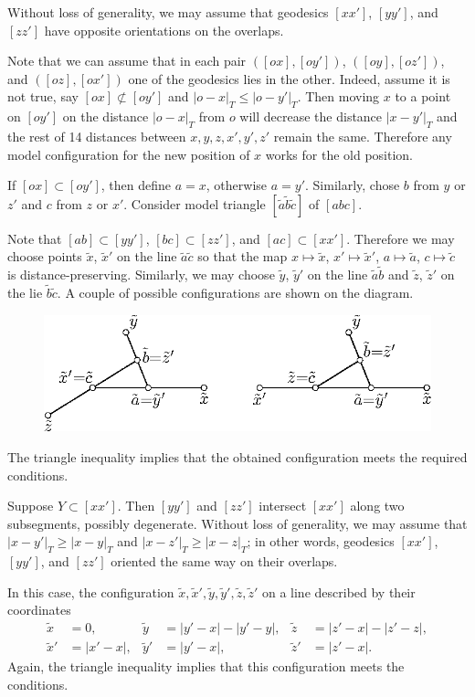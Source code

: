 \documentclass{article}
\begin{document}
Without loss of generality, we may assume that geodesics $[xx']$, $[yy']$, and $[zz']$ have opposite orientations on the overlaps.

Note that we can assume that in each pair $([ox],[oy'])$, $([oy],[oz'])$, and $([oz],[ox'])$ one of the geodesics lies in the other.
Indeed, assume it is not true, say $[ox]\not\subset[oy']$ and $|o-x|_T\le |o-y'|_T$.
Then moving $x$ to a point on $[oy']$ on the distance $|o-x|_T$ from $o$ will decrease the distance $|x-y'|_T$ and the rest of 14 distances between $x,y,z,x',y',z'$ remain the same.
Therefore any model configuration for the new position of $x$ works for the old position.

If $[ox]\subset [oy']$, then define $a=x$, otherwise $a=y'$.
Similarly, chose  $b$ from $y$ or $z'$ and $c$ from $z$ or $x'$.
Consider model triangle $[\tilde a\tilde b\tilde c]$ of $[abc]$.

Note that $[ab]\subset [yy']$, $[bc]\subset [zz']$, and $[ac]\subset [xx']$.
Therefore we may choose points $\tilde x$, $\tilde x'$ on the line $\tilde a\tilde c$ so that the map $x\mapsto \tilde x$, $x'\mapsto \tilde x'$, $a\mapsto \tilde a$, $c\mapsto \tilde c$ is distance-preserving.
Similarly, we may choose $\tilde y$, $\tilde y'$ on the line $\tilde a\tilde b$ and $\tilde z$, $\tilde z'$ on the lie $\tilde b\tilde c$.
A couple of possible configurations are shown on the diagram.

\begin{figure}[ht!]
\centering
\includegraphics{mppics/pic-50}
\end{figure}

The triangle inequality implies that the obtained configuration meets the required conditions.

Suppose $Y\subset [xx']$.
Then $[yy']$ and $[zz']$ intersect $[xx']$ along two subsegments, possibly degenerate.
Without loss of generality, we may assume that $|x-y'|_T\ge |x-y|_T$ and $|x-z'|_T\ge |x-z|_T$;
in other words, geodesics $[xx']$, $[yy']$, and $[zz']$ oriented the same way on their overlaps.

In this case, the configuration $\tilde x,\tilde x',\tilde y,\tilde y',\tilde z,\tilde z'$ on a line described by their coordinates
\begin{align*}
\tilde x&=0,
&
\tilde y&=|y'-x|-|y'-y|,
&
\tilde z&=|z'-x|-|z'-z|,
\\
\tilde x'&=|x'-x|,
&
\tilde y'&=|y'-x|,
&
\tilde z'&=|z'-x|.
\end{align*}
Again, the triangle inequality implies that this configuration meets the conditions. 
\end{document}
